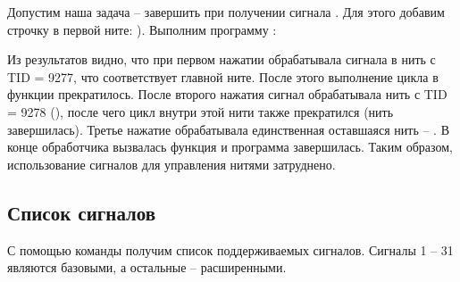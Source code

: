 

Допустим наша задача -- завершить  при получении сигнала . Для этого добавим строчку в первой ните: ). Выполним программу :



Из результатов видно, что при первом нажатии  обрабатывала сигнала в  нить с TID = 9277, что соответствует главной ните. После этого выполнение цикла в функции  прекратилось. После второго нажатия  сигнал обрабатывала нить с TID = 9278 (), после чего цикл внутри этой нити также прекратился (нить завершилась). Третье нажатие  обрабатывала единственная оставшаяся нить -- . В конце обработчика вызвалась функция  и программа завершилась. Таким образом, использование сигналов для управления нитями затруднено.

\subsection{Список сигналов}

С помощью команды  получим список поддерживаемых сигналов. Сигналы 1 -- 31 являются базовыми, а остальные -- расширенными.



